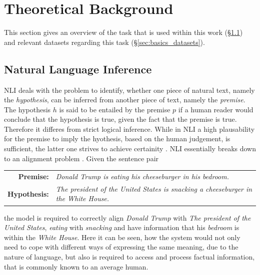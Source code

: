 \section{Theoretical Background}\label{sec:basics}
This section gives an overview of the task that is used within this work (§\ref{sec:basics_nli}) and relevant datasets regarding this task (§\ref{sec:basics_datasets}).
\subsection{Natural Language Inference}\label{sec:basics_nli}
\ac{NLI} \citep{bowman2015large} deals with the problem to identify, whether one piece of natural text, namely the \textit{hypothesis}, can be inferred from another piece of text, namely the \textit{premise}. The hypothesis $h$ is said to be entailed by the premise $p$ if a human reader would conclude that the hypothesis is true, given the fact that the premise is true. Therefore it differes from strict logical inference. While in \ac{NLI} a high plausability for the premise to imply the hyothesis, based on the human judgement, is sufficient, the latter one strives to achieve certainity \citep{dagan2009recognizing}. \ac{NLI} essentially breaks down to an alignment problem \citep{maccartney2008phrase}. Given the sentence pair
\begin{center}
\begin{tabular}{rl}
\textbf{Premise:} & \textit{Donald Trump is eating his cheeseburger in his bedroom.} \\
\textbf{Hypothesis:} & \textit{The president of the United States is snacking a cheeseburger in the White House.} 
\end{tabular}
\end{center}
the model is required to correctly align \textit{Donald Trump} with \textit{The president of the United States}, \textit{eating} with \textit{snacking} and have information that his \textit{bedroom} is within the \textit{White House}. Here it can be seen, how the system would not only need to cope with different ways of expressing the same meaning, due to the nature of language, but also is required to access and process factual information, that is commonly known to an average human. 
\newline
